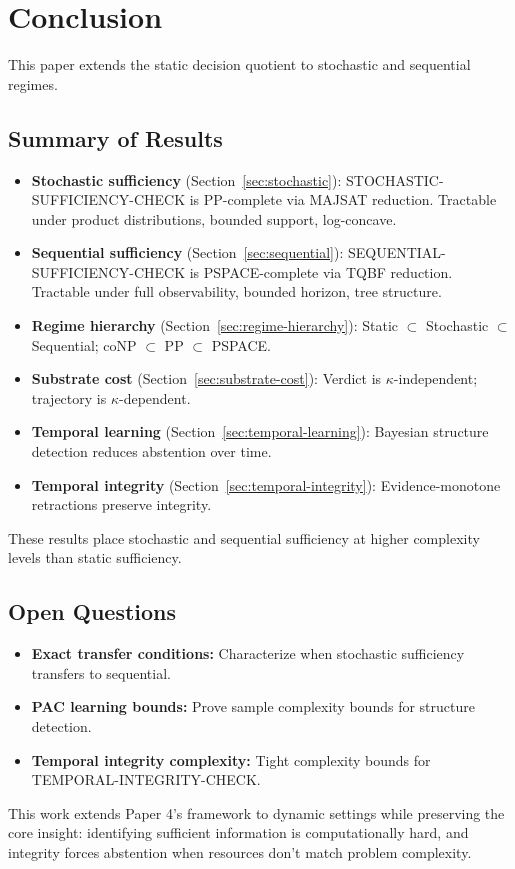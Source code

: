 \section{Conclusion}\label{sec:conclusion}

This paper extends the static decision quotient to stochastic and sequential regimes.

\subsection*{Summary of Results}

\begin{itemize}
\item \textbf{Stochastic sufficiency} (Section~\ref{sec:stochastic}): STOCHASTIC-SUFFICIENCY-CHECK is PP-complete via MAJSAT reduction. Tractable under product distributions, bounded support, log-concave.

\item \textbf{Sequential sufficiency} (Section~\ref{sec:sequential}): SEQUENTIAL-SUFFICIENCY-CHECK is PSPACE-complete via TQBF reduction. Tractable under full observability, bounded horizon, tree structure.

\item \textbf{Regime hierarchy} (Section~\ref{sec:regime-hierarchy}): Static $\subset$ Stochastic $\subset$ Sequential; coNP $\subset$ PP $\subset$ PSPACE.

\item \textbf{Substrate cost} (Section~\ref{sec:substrate-cost}): Verdict is $\kappa$-independent; trajectory is $\kappa$-dependent.

\item \textbf{Temporal learning} (Section~\ref{sec:temporal-learning}): Bayesian structure detection reduces abstention over time.

\item \textbf{Temporal integrity} (Section~\ref{sec:temporal-integrity}): Evidence-monotone retractions preserve integrity.
\end{itemize}

These results place stochastic and sequential sufficiency at higher complexity levels than static sufficiency.

\subsection*{Open Questions}

\begin{itemize}
\item \textbf{Exact transfer conditions:} Characterize when stochastic sufficiency transfers to sequential.
\item \textbf{PAC learning bounds:} Prove sample complexity bounds for structure detection.
\item \textbf{Temporal integrity complexity:} Tight complexity bounds for TEMPORAL-INTEGRITY-CHECK.
\end{itemize}

This work extends Paper 4's framework to dynamic settings while preserving the core insight: identifying sufficient information is computationally hard, and integrity forces abstention when resources don't match problem complexity.
